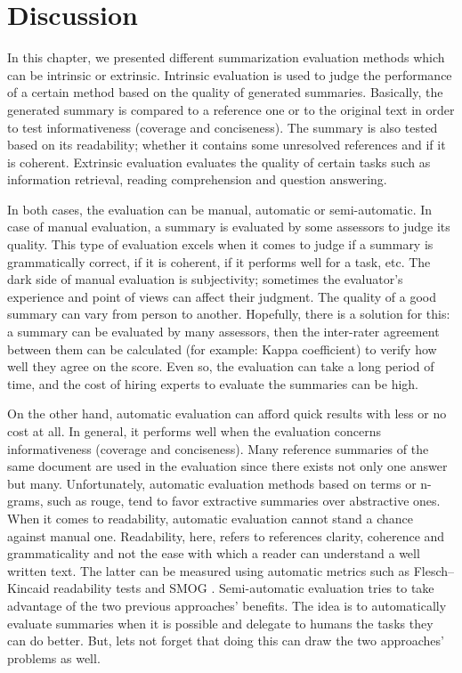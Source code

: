 \section{Discussion}

In this chapter, we presented different summarization evaluation methods which can be intrinsic or extrinsic. 
Intrinsic evaluation is used to judge the performance of a certain method based on the quality of generated summaries.
Basically, the generated summary is compared to a reference one or to the original text in order to test informativeness (coverage and conciseness). 
The summary is also tested based on its readability; whether it contains some unresolved references and if it is coherent.
Extrinsic evaluation evaluates the quality of certain tasks such as information retrieval, reading comprehension and question answering.


In both cases, the evaluation can be manual, automatic or semi-automatic. 
In case of manual evaluation, a summary is evaluated by some assessors to judge its quality. 
This type of evaluation excels when it comes to judge if a summary is grammatically correct, if it is coherent, if it performs well for a task, etc.
The dark side of manual evaluation is subjectivity; sometimes the evaluator's experience and point of views can affect their judgment. 
The quality of a good summary can vary from person to another.
Hopefully, there is a solution for this: a summary can be evaluated by many assessors, then the inter-rater agreement between them can be calculated (for example: Kappa coefficient) to verify how well they agree on the score.
Even so, the evaluation can take a long period of time, and the cost of hiring experts to evaluate the summaries can be high. 

On the other hand, automatic evaluation can afford quick results with less or no cost at all. 
In general, it performs well when the evaluation concerns informativeness (coverage and conciseness). 
Many reference summaries of the same document are used in the evaluation since there exists not only one answer but many.
Unfortunately, automatic evaluation methods based on terms or n-grams, such as \ac{rouge}, tend to favor extractive summaries over abstractive ones.
When it comes to readability, automatic evaluation cannot stand a chance against manual one.
Readability, here, refers to references clarity, coherence and grammaticality and not the ease with which a reader can understand a well written text. 
The latter can be measured using automatic metrics such as Flesch–Kincaid readability tests \citep{75-kincaid-al} and SMOG \citep{69-laughlin-harry}.
Semi-automatic evaluation tries to take advantage of the two previous approaches' benefits. 
The idea is to automatically evaluate summaries when it is possible and delegate to humans the tasks they can do better.  
But, lets not forget that doing this can draw the two approaches' problems as well.


